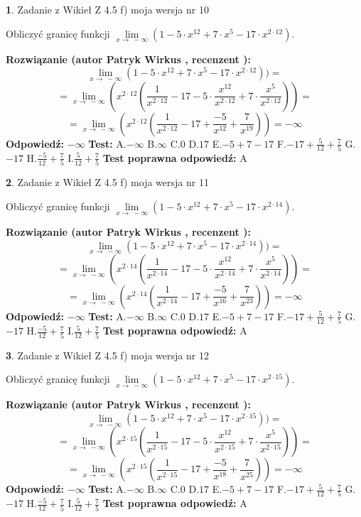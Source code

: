 \documentclass[12pt, a4paper]{article}
\theoremstyle{definition} %
\newtheorem{zad}{}
\newcommand{\zadStart}[1]{\begin{zad}#1\newline}
\newcommand{\zadStop}{\end{zad}}
\newcommand{\rozwStart}[2]{\noindent \textbf{Rozwiązanie (autor #1 , recenzent #2): }\newline}
\newcommand{\rozwStop}{\newline}
\newcommand{\odpStart}{\noindent \textbf{Odpowiedź:}\newline}
\newcommand{\odpStop}{\newline}
\newcommand{\testStart}{\noindent \textbf{Test:}\newline}
\newcommand{\testStop}{\newline}
\newcommand{\kluczStart}{\noindent \textbf{Test poprawna odpowiedź:}\newline}
\newcommand{\kluczStop}{\newline}
\begin{document}
\zadStart{Zadanie z Wikieł Z 4.5 f) moja wersja nr 10}



Obliczyć granicę funkcji  $\lim\limits_{x\to\ -\infty}(1 - 5 \cdot x^{12}+7 \cdot x^{5}- 17 \cdot x^{2\cdot12})$.
\zadStop
\rozwStart{Patryk Wirkus}{}
$$\lim\limits_{x\to\ -\infty}(1 - 5 \cdot x^{12}+7 \cdot x^{5}- 17 \cdot x^{2\cdot12}))=$$
$$=\lim\limits_{x\to\ -\infty}(x^{2\cdot12}(\frac{1}{x^{2\cdot12}}-17 -5 \cdot \frac{x^{12}}{x^{2\cdot12}}+7 \cdot \frac{x^{5}}{x^{2\cdot12}}))=$$
$$=\lim\limits_{x\to\ -\infty}(x^{2\cdot12}(\frac{1}{x^{2\cdot12}}-17 + \frac{-5}{x^{12}}+ \frac{7}{x^{19}}))=-\infty$$
\rozwStop
\odpStart
$-\infty$
\odpStop
\testStart
A.$-\infty$ B.$\infty$ C.$0$ D.$17$ E.$-5 + 7 - 17$
F.$-17+\frac{5}{12}+\frac{7}{5}$ G.$-17$
H.$\frac{-5}{12}+\frac{7}{5}$
I.$\frac{5}{12}+\frac{7}{5}$
\testStop
\kluczStart
A
\kluczStop



\zadStart{Zadanie z Wikieł Z 4.5 f) moja wersja nr 11}



Obliczyć granicę funkcji  $\lim\limits_{x\to\ -\infty}(1 - 5 \cdot x^{12}+7 \cdot x^{5}- 17 \cdot x^{2\cdot14})$.
\zadStop
\rozwStart{Patryk Wirkus}{}
$$\lim\limits_{x\to\ -\infty}(1 - 5 \cdot x^{12}+7 \cdot x^{5}- 17 \cdot x^{2\cdot14}))=$$
$$=\lim\limits_{x\to\ -\infty}(x^{2\cdot14}(\frac{1}{x^{2\cdot14}}-17 -5 \cdot \frac{x^{12}}{x^{2\cdot14}}+7 \cdot \frac{x^{5}}{x^{2\cdot14}}))=$$
$$=\lim\limits_{x\to\ -\infty}(x^{2\cdot14}(\frac{1}{x^{2\cdot14}}-17 + \frac{-5}{x^{16}}+ \frac{7}{x^{23}}))=-\infty$$
\rozwStop
\odpStart
$-\infty$
\odpStop
\testStart
A.$-\infty$ B.$\infty$ C.$0$ D.$17$ E.$-5 + 7 - 17$
F.$-17+\frac{5}{12}+\frac{7}{5}$ G.$-17$
H.$\frac{-5}{12}+\frac{7}{5}$
I.$\frac{5}{12}+\frac{7}{5}$
\testStop
\kluczStart
A
\kluczStop



\zadStart{Zadanie z Wikieł Z 4.5 f) moja wersja nr 12}



Obliczyć granicę funkcji  $\lim\limits_{x\to\ -\infty}(1 - 5 \cdot x^{12}+7 \cdot x^{5}- 17 \cdot x^{2\cdot15})$.
\zadStop
\rozwStart{Patryk Wirkus}{}
$$\lim\limits_{x\to\ -\infty}(1 - 5 \cdot x^{12}+7 \cdot x^{5}- 17 \cdot x^{2\cdot15}))=$$
$$=\lim\limits_{x\to\ -\infty}(x^{2\cdot15}(\frac{1}{x^{2\cdot15}}-17 -5 \cdot \frac{x^{12}}{x^{2\cdot15}}+7 \cdot \frac{x^{5}}{x^{2\cdot15}}))=$$
$$=\lim\limits_{x\to\ -\infty}(x^{2\cdot15}(\frac{1}{x^{2\cdot15}}-17 + \frac{-5}{x^{18}}+ \frac{7}{x^{25}}))=-\infty$$
\rozwStop
\odpStart
$-\infty$
\odpStop
\testStart
A.$-\infty$ B.$\infty$ C.$0$ D.$17$ E.$-5 + 7 - 17$
F.$-17+\frac{5}{12}+\frac{7}{5}$ G.$-17$
H.$\frac{-5}{12}+\frac{7}{5}$
I.$\frac{5}{12}+\frac{7}{5}$
\testStop
\kluczStart
A
\kluczStop
\end{document}
